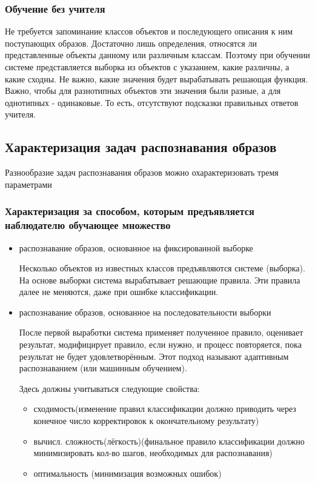     	    \subsubsection{Обучение без учителя}
    	        Не требуется запоминание классов объектов и последующего описания к ним поступающих образов. Достаточно лишь определения, относятся ли представленные объекты данному или различным классам. Поэтому при обучении системе представляется выборка из объектов с указанием, какие различны, а какие сходны. Не важно, какие значения будет вырабатывать решающая функция. Важно, чтобы для разнотипных объектов эти значения были разные, а для однотипных - одинаковые. 
    	        То есть, отсутствуют подсказки правильных ответов учителя.
        \subsection{Характеризация задач распознавания образов}
            Разнообразие задач распознавания образов можно охарактеризовать тремя параметрами
            
	        \subsubsection{Характеризация за способом, которым предъявляется наблюдателю обучающее множество}
	            \begin{itemize}
			        \item распознавание образов, основанное на     фиксированной выборке
			            
			            Несколько объектов из известных классов предъявляются системе (выборка). На основе выборки система вырабатывает решающие правила. Эти правила далее не меняются, даже при ошибке классификации.
				    \item распознавание образов, основанное на     последовательности выборки
				    
				        После первой выработки система применяет полученное правило, оценивает результат, модифицирует правило, если нужно, и процесс повторяется, пока результат не будет удовлетворённым. Этот подход называют адаптивным распознаванием (или машинным обучением).
				        
				        Здесь должны учитываться следующие свойства:
				        \begin{itemize}
    				        \item сходимость(изменение правил классификации должно приводить через конечное число корректировок к окончательному результату)
    					    \item вычисл. сложность(лёгкость)(финальное правило классификации должно минимизировать кол-во шагов, необходимых для распознавания)
    					    \item оптимальность (минимизация возможных ошибок)
    				    \end{itemize}
			    \end{itemize}
